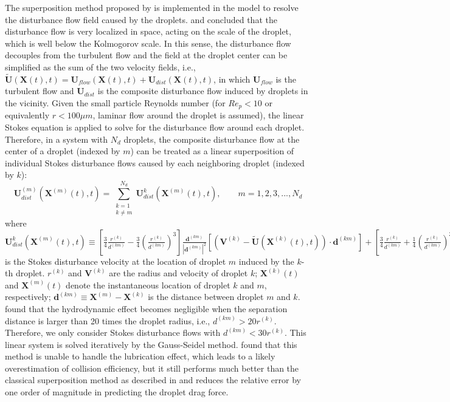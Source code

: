 The superposition method proposed by \citet{Wang2005a,Wang2005b} is implemented in the model to resolve the disturbance flow field caused by the droplets. \citet{Wang2005b} and \citet{Ayala2007} concluded that the disturbance flow is very localized in space, acting on the scale of the droplet, which is well below the Kolmogorov scale. In this sense, the disturbance flow decouples from the turbulent flow and the field at the droplet center can be simplified as the sum of the two velocity fields, i.e., $\tilde{\mathbf{U}}(\mathbf{X}(t),t)=\mathbf{U}_{flow} (\mathbf{X}(t),t)+\mathbf{U}_{dist} (\mathbf{X}(t),t)$, in which $\mathbf{U}_{flow}$ is the turbulent flow and $\mathbf{U}_{dist}$ is the composite disturbance flow induced by droplets in the vicinity. Given the small particle Reynolds number (for $Re_p<10$ or equivalently $r<100 \mu m$, laminar flow around the droplet is assumed), the linear Stokes equation is applied to solve for the disturbance flow around each droplet. Therefore, in a system with $N_d$ droplets, the composite disturbance flow at the center of a droplet (indexed by $m$) can be treated as a linear superposition of individual Stokes disturbance flows caused by each neighboring droplet (indexed by $k$):
\begin{equation}
\mathbf{U}^{(m)}_{dist}\left(\mathbf{X}^{(m)}(t),t\right)=\sum_{ \substack{k=1 \\ k\neq m}}^{N_d}\mathbf{U}_{dist}^{k}\left(\mathbf{X}^{(m)}(t),t\right),     \qquad m=1,2,3,...,N_d
\label{eqn:hydro1}
\end{equation}
where $\mathbf{U}_{dist}^{k}\left(\mathbf{X}^{(m)}(t),t\right) \equiv \left[ \frac{3}{4}\frac{r^{(k)}}{d^{(km)}}-\frac{3}{4}\left(\frac{r^{(k)}}{d^{(km)}}\right)^3 \right]\frac{\mathbf{d}^{(km)}}{|\mathbf{d}^{(km)}|^2} \left[\left(\mathbf{V}^{(k)}-\tilde{\mathbf{U}}(\mathbf{X}^{(k)}(t),t)\right)\cdot \mathbf{d}^{(km)} \right] + \left[\frac{3}{4}\frac{r^{(k)}}{d^{(km)}}+\frac{1}{4}\left(\frac{r^{(k)}}{d^{(km)}}\right)^3\right] \left(\mathbf{V}^{(k)}-\tilde{\mathbf{U}}\left(\mathbf{X}^{(k)}(t),t\right)\right)$ is the Stokes disturbance velocity at the location of droplet $m$ induced by the $k$-th droplet.  $r^{(k)}$ and $\mathbf{V}^{(k)}$ are the radius and velocity of droplet $k$; $\mathbf{X}^{(k)} (t)$ and $\mathbf{X}^{(m)} (t)$ denote the instantaneous location of droplet $k$ and $m$, respectively; $\mathbf{d}^{(km)} \equiv \mathbf{X}^{(m)}-\mathbf{X}^{(k)}$ is the distance between droplet $m$ and $k$. \citet{Wang2005b} found that the hydrodynamic effect becomes negligible when the separation distance is larger than 20 times the droplet radius, i.e., $d^{(km)}>20 r^{(k)}$. Therefore, we only consider Stokes disturbance flows with $d^{(km)}<30 r^{(k)}$. This linear system is solved iteratively by the Gauss-Seidel method. \citet{Wang2005a} found that this method is unable to handle the lubrication effect, which leads to a likely overestimation of collision efficiency, but it still performs much better than the classical superposition method as described in \citet{Pruppacher1997} and reduces the relative error by one order of magnitude in predicting the droplet drag force.


